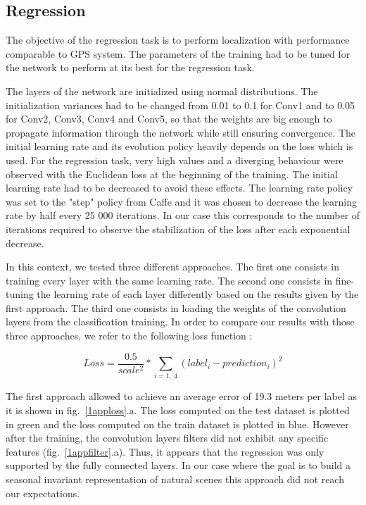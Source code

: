 \subsection{Regression}
\label{sec:results-regression}
The objective of the regression task is to perform localization with performance comparable to GPS system. The parameters of the training had to be tuned for the network to perform at its best for the regression task.

The layers of the network are initialized using normal distributions. The initialization variances had to be changed from 0.01 to 0.1 for Conv1 and to 0.05 for Conv2, Conv3, Conv4 and Conv5, so that the weights are big enough to propagate information through the network while still ensuring convergence.
The initial learning rate and its evolution policy heavily depends on the loss which is used. For the regression task, very high values and a diverging behaviour were observed with the Euclidean loss at the beginning of the training. The initial learning rate had to be decreased to avoid these effects. The learning rate policy was set to the "step" policy from Caffe and it was chosen to decrease the learning rate by half every 25 000 iterations. In our case this corresponds to the number of iterations required to observe the stabilization of the loss after each exponential decrease.

In this context, we tested three different approaches.  The first one consists in training every layer with the same learning rate. The second one consists in fine-tuning the learning rate of each layer differently based on the results given by the first approach. The third one consists in loading the weights of the convolution layers from the classification training. In order to compare our results with those three approaches, we refer to the following loss function :

\begin{equation} 
Loss = \frac{0.5}{scale^{2}}*\sum_{i=1,\ 4}(label_{i}-prediction_{i})^{2}
\end{equation}

The first approach allowed to achieve an average error of 19.3 meters per label as it is shown in fig.~\ref{1apploss}.a. The loss computed on the test dataset is plotted in green and the loss computed on the train dataset is plotted in blue. However after the training, the convolution layers filters did not exhibit any specific features (fig.~\ref{1appfilter}.a). Thus, it appears that the regression was only supported by the fully connected layers. In our case where the goal is to build a seasonal invariant representation of natural scenes this approach did not reach our expectations. 

